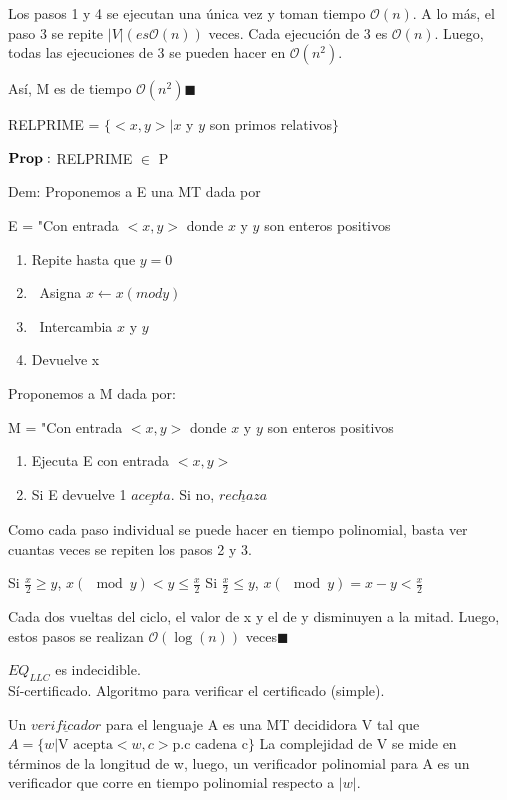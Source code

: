 \documentclass{homework}
\begin{document}
Los pasos 1 y 4 se ejecutan una única vez y toman tiempo $\mathcal{O}(n)$. A lo más, el paso 3 se repite $|V| (es \mathcal{O}(n))$ veces. Cada ejecución de 3 es $\mathcal{O}(n)$. Luego, todas las ejecuciones de 3 se pueden hacer en $\mathcal{O}(n^2)$.

Así, M es de tiempo $\mathcal{O}(n^2) \blacksquare$

RELPRIME = $\{ <x,y> |x$ y $y$ son primos relativos$\}$

$\bf{Prop:}$ RELPRIME $\in$ P

Dem: Proponemos a E una MT dada por 

E = "Con entrada $<x,y>$ donde $x$ y $y$ son enteros positivos
\begin{enumerate}
	\item Repite hasta que $y = 0$
	\item $\  $	Asigna $x \leftarrow x (mod y)$
	\item $\  $	Intercambia $x$ y $y$
	\item Devuelve x
\end{enumerate}

Proponemos a M dada por:

M = "Con entrada $<x,y>$ donde $x$ y $y$ son enteros positivos
\begin{enumerate}
	\item Ejecuta E con entrada $<x,y>$
	\item Si E devuelve 1 $\underline{acepta}$. Si no, $\underline{rechaza}$
\end{enumerate}

Como cada paso individual se puede hacer en tiempo polinomial, basta ver cuantas veces se repiten los pasos 2 y 3. 

Si $\frac{x}{2} \geq y$, $x (\mod y) < y \leq \frac{x}{2}$
Si $\frac{x}{2} \leq y$, $x (\mod y) = x - y < \frac{x}{2}$

Cada dos vueltas del ciclo, el valor de x y el de y disminuyen a la mitad. Luego, estos pasos se realizan $\mathcal{O}(\log(n))$ veces$\blacksquare$

$EQ_{LLC}$ es indecidible.\\

Sí-certificado. Algoritmo para verificar el certificado (simple).

Un $\underline{verificador}$ para el lenguaje A es una MT decididora V tal que $A = \{w | \text{V acepta} <w,c> \text{p.c cadena c}\}$
La complejidad de V se mide en términos de la longitud de w, luego, un verificador polinomial para A es un verificador que corre en tiempo polinomial respecto a $|w|$.\\
\end{document}
